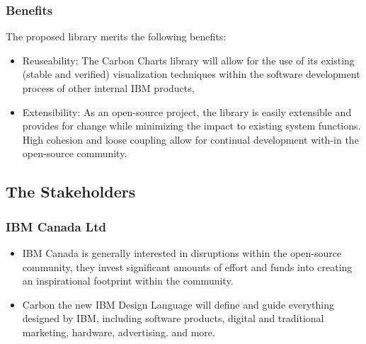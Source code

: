 \documentclass[12pt, titlepage]{article}
\begin{document}
\subsubsection{Benefits}
The proposed library merits the following benefits:
\begin{itemize}
    \item Reuseability: The Carbon Charts library will allow for the use of its existing (stable and verified) visualization techniques within the software development process of other internal IBM products,  
    \item Extensibility: As an open-source project, the library is easily extensible and provides for change while minimizing the impact to existing system functions. High cohesion and loose coupling allow for continual development with-in the open-source community.
    
    
\end{itemize}

\subsection{The Stakeholders}
\subsubsection{IBM Canada Ltd}
\begin{itemize}

    \item IBM Canada is generally interested in disruptions within the open-source community, they invest significant amounts of effort and funds into creating an inspirational footprint within the community.
   
    \item Carbon the new IBM Design Language will define and guide everything designed by IBM, including software products, digital and traditional marketing, hardware, advertising. and more. 
    
    
\end{itemize}
\end{document}
